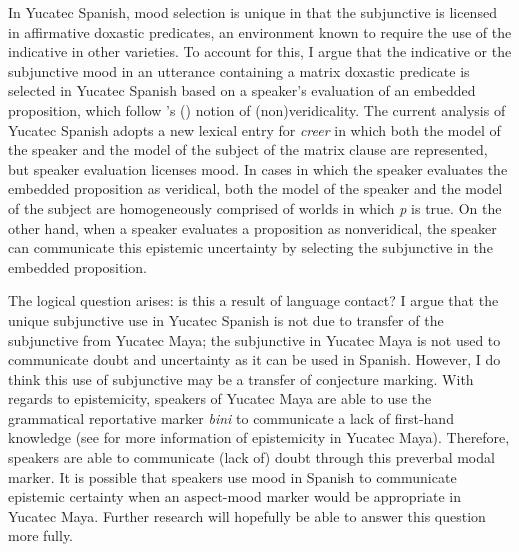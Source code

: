 \documentclass[output=paper,colorlinks,citecolor=brown,
]{langscibook}
\begin{document}
In Yucatec Spanish, mood selection is unique in that the subjunctive is licensed in affirmative doxastic predicates, an environment known to require the use of the indicative in other varieties. To account for this, I argue that the indicative or the subjunctive mood in an utterance containing a matrix doxastic predicate is selected in Yucatec Spanish based on a speaker's evaluation of an embedded proposition, which follow \citeauthor{Giannakidou2015}'s (\citeyear{Giannakidou2015}) notion of (non)veridicality. The current analysis of Yucatec Spanish adopts a new lexical entry for \textit{creer} in which both the model of the speaker and the model of the subject of the matrix clause are represented, but speaker evaluation licenses mood. In cases in which the speaker evaluates the embedded proposition as veridical, both the model of the speaker and the model of the subject are homogeneously comprised of worlds in which \textit{p }is true. On the other hand, when a speaker evaluates a proposition as nonveridical, the speaker can communicate this epistemic uncertainty by selecting the subjunctive in the embedded proposition. 



The logical question arises: is this a result of language contact? I argue that the unique subjunctive use in Yucatec Spanish is not due to transfer of the subjunctive from Yucatec Maya; the subjunctive in Yucatec Maya is not used to communicate doubt and uncertainty as it can be used in Spanish. However, I do think this use of subjunctive may be a transfer of conjecture marking. With regards to epistemicity, speakers of Yucatec Maya are able to use the grammatical reportative marker \textit{bini} to communicate a lack of first-hand knowledge (see \citealt{LeGuen2018} for more information of epistemicity in Yucatec Maya). Therefore, speakers are able to communicate (lack of) doubt through this preverbal modal marker. It is possible that speakers use mood in Spanish to communicate epistemic certainty when an aspect-mood marker would be appropriate in Yucatec Maya. Further research will hopefully be able to answer this question more fully. 
\end{document}

